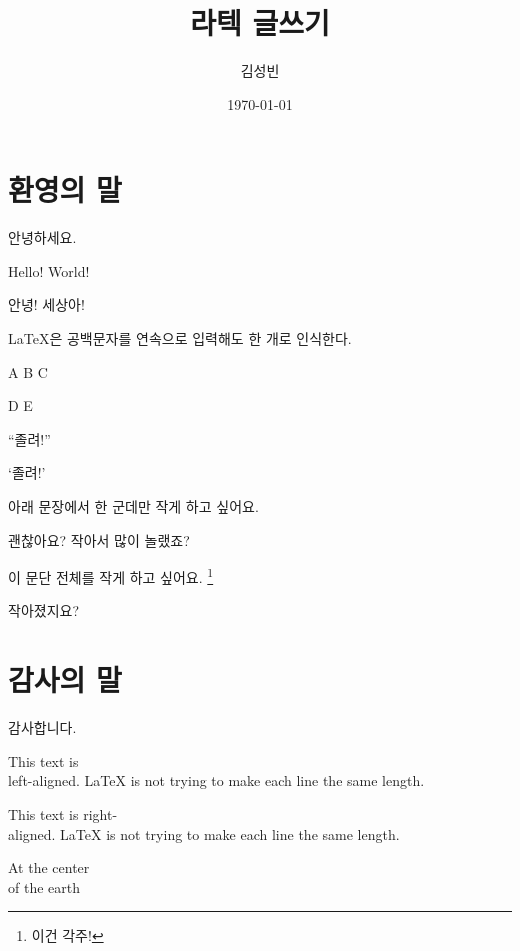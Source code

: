 \documentclass[footnote]{oblivoir}
\title{라텍 글쓰기}
\author{김성빈}
\date{\today}
\begin{document}
\maketitle
\tableofcontents

\section{환영의 말}
안녕하세요.

Hello! World!

안녕! 세상아!

\LaTeX{}은 공백문자를      연속으로 입력해도 한     개로 인식한다.

A         B C

D  E

``졸려!''

`졸려!'

아래 문장에서 한 군데만 작게 하고 싶어요.

괜찮아요? {\tiny 작아서} 많이 놀랬죠?

\begin{footnotesize}
이 문단 전체를 작게 하고 싶어요. \footnote{이건 각주!}

작아졌지요?
\end{footnotesize}

\section{감사의 말}
감사합니다.

\begin{flushleft}
This text is\\ left-aligned. \LaTeX{} is not trying to make each line the same length.
\end{flushleft}

\begin{flushright}
This text is right-\\ aligned.
\LaTeX{} is not trying to make each line the same length.
\end{flushright}

\begin{center}
At the center \\ of the earth
\end{center}
\end{document}
